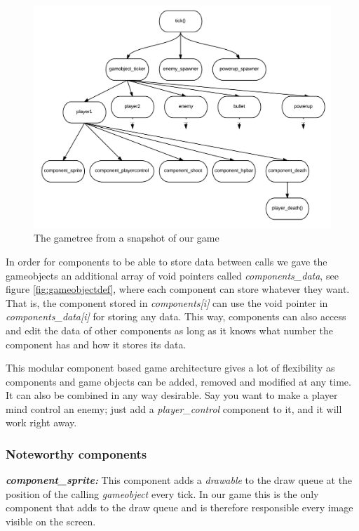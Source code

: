 \documentclass[a4paper,12pt]{article}
\begin{document}
\begin{figure}
\centering
\includegraphics[width=\textwidth]{gametreesnapshot}
\caption{The gametree from a snapshot of our game}
\label{fig:enginesnapshot}
\end{figure}

In order for components to be able to store data between calls we gave the gameobjects an additional array of void pointers called \emph{components\_data}, see figure \ref{fig:gameobjectdef}, where each component can store whatever they want. That is, the component stored in \emph{components[i]} can use the void pointer in \emph{components\_data[i]} for storing any data. This way, components can also access and edit the data of other components as long as it knows what number the component has and how it stores its data. 

This modular component based game architecture gives a lot of flexibility as components and game objects can be added, removed and modified at any time. It can also be combined in any way desirable. Say you want to make a player mind control an enemy; just add a \emph{player\_control} component to it, and it will work right away.

\subsubsection{Noteworthy components} %

\textbf{\emph{component\_sprite:}} This component adds a \emph{drawable} to the draw queue at the position of the calling \emph{gameobject} every tick. In our game this is the only component that adds to the draw queue and is therefore responsible every image visible on the screen.
\end{document}
